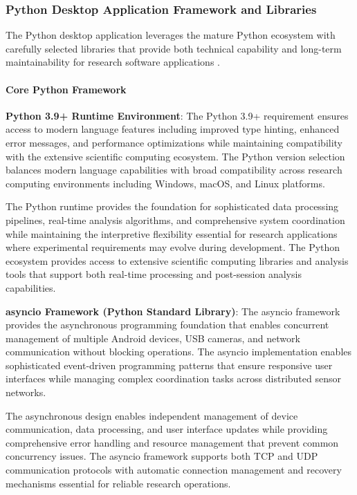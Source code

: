 \documentclass[12pt,a4paper]{article}
\begin{document}
\subsubsection{Python Desktop Application Framework and Libraries}

The Python desktop application leverages the mature Python ecosystem with carefully selected libraries that provide both
technical capability and long-term maintainability for research software applications .

\paragraph{Core Python Framework}

\textbf{Python 3.9+ Runtime Environment}: The Python 3.9+ requirement ensures access to modern language features including
improved type hinting, enhanced error messages, and performance optimizations while maintaining compatibility with the
extensive scientific computing ecosystem. The Python version selection balances modern language capabilities with broad
compatibility across research computing environments including Windows, macOS, and Linux platforms.

The Python runtime provides the foundation for sophisticated data processing pipelines, real-time analysis algorithms,
and comprehensive system coordination while maintaining the interpretive flexibility essential for research applications
where experimental requirements may evolve during development. The Python ecosystem provides access to extensive
scientific computing libraries and analysis tools that support both real-time processing and post-session analysis
capabilities.

\textbf{asyncio Framework (Python Standard Library)}: The asyncio framework provides the asynchronous programming foundation
that enables concurrent management of multiple Android devices, USB cameras, and network communication without blocking
operations. The asyncio implementation enables sophisticated event-driven programming patterns that ensure responsive
user interfaces while managing complex coordination tasks across distributed sensor networks.

The asynchronous design enables independent management of device communication, data processing, and user interface
updates while providing comprehensive error handling and resource management that prevent common concurrency issues. The
asyncio framework supports both TCP and UDP communication protocols with automatic connection management and recovery
mechanisms essential for reliable research operations.
\end{document}
